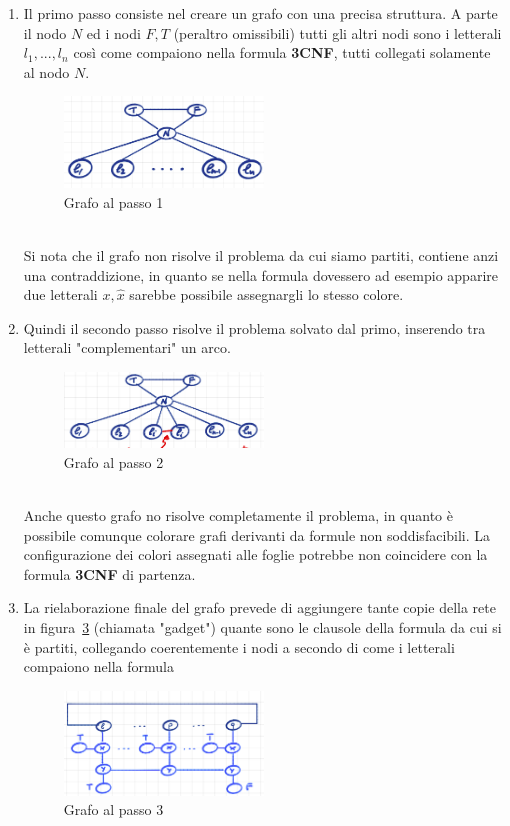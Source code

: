 \documentclass[a4paper]{article}
\begin{document}
\begin{enumerate}
	\item Il primo passo consiste nel creare un grafo con una precisa struttura.
		A parte il nodo $N$ ed i nodi $F,T$ (peraltro omissibili) tutti gli altri nodi sono i letterali $l_1,...,l_n$ così come compaiono nella formula \textbf{3CNF}, tutti collegati solamente al nodo $N$.
		\begin{figure}[!ht]
		\centering
		\includegraphics[width = 0.5\textwidth]{./img/E10_passo1.png}
		\caption{Grafo al passo 1} \label{FIG:E10_passo1}
		\end{figure}\\
		Si nota che il grafo non risolve il problema da cui siamo partiti, contiene anzi una contraddizione, in quanto se nella formula dovessero ad esempio apparire due letterali ${x,\hat x}$ sarebbe possibile assegnargli lo stesso colore.
	\item Quindi il secondo passo risolve il problema solvato dal primo, inserendo tra letterali "complementari" un arco.
		\begin{figure}[!ht]
		\centering
		\includegraphics[width = 0.5\textwidth]{./img/E10_passo2.png}
		\caption{Grafo al passo 2} \label{FIG:E10_passo2}
		\end{figure}\\
		Anche questo grafo no risolve completamente il problema, in quanto è possibile comunque colorare grafi derivanti da formule non soddisfacibili.
		La configurazione dei colori assegnati alle foglie potrebbe non coincidere con la formula \textbf{3CNF} di partenza.
	\item La rielaborazione finale del grafo prevede di aggiungere tante copie della rete in figura~\ref{FIG:E10_passo3} (chiamata "gadget") quante sono le clausole della formula da cui si è partiti, collegando coerentemente i nodi a secondo di come i letterali compaiono nella formula
		\begin{figure}[!ht]
		\centering
		\includegraphics[width = 0.5\textwidth]{./img/E10_passo3.png}
		\caption{Grafo al passo 3} \label{FIG:E10_passo3}
		\end{figure}\\
\end{enumerate}
\end{document}
